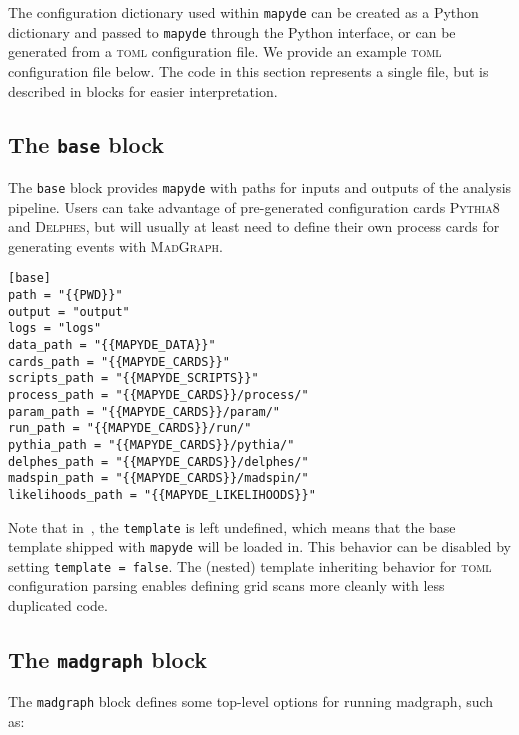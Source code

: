 \documentclass{article}
\newcommand{\mapyde}{\texttt{mapyde}}
\newcommand{\madgraph}{\textsc{MadGraph}}
\newcommand{\pythia}{\textsc{Pythia8}}
\newcommand{\delphes}{\textsc{Delphes}}
\newcommand{\toml}{\textsc{toml}}
\begin{document}
The configuration dictionary used within \mapyde{} can be created as a Python dictionary and passed to \mapyde{} through the Python interface, or can be generated from a \toml{} configuration file.  We provide an example \toml{} configuration file below.  The code in this section represents a single file, but is described in blocks for easier interpretation.

\subsection{The \texttt{base} block}
\label{ssec:the-base-block}

The \texttt{base} block provides \mapyde{} with paths for inputs and outputs of the analysis pipeline.  Users can take advantage of pre-generated configuration cards \pythia{} and \delphes, but will usually at least need to define their own process cards for generating events with \madgraph.

\begin{listing}[H]
	\begin{verbatim}
[base]
path = "{{PWD}}"
output = "output"
logs = "logs"
data_path = "{{MAPYDE_DATA}}"
cards_path = "{{MAPYDE_CARDS}}"
scripts_path = "{{MAPYDE_SCRIPTS}}"
process_path = "{{MAPYDE_CARDS}}/process/"
param_path = "{{MAPYDE_CARDS}}/param/"
run_path = "{{MAPYDE_CARDS}}/run/"
pythia_path = "{{MAPYDE_CARDS}}/pythia/"
delphes_path = "{{MAPYDE_CARDS}}/delphes/"
madspin_path = "{{MAPYDE_CARDS}}/madspin/"
likelihoods_path = "{{MAPYDE_LIKELIHOODS}}"
        \end{verbatim}
	\caption{The \texttt{base} block of an example \toml{} configuration file for generating slepton events.}
	\label{slepton-config-base}
\end{listing}

Note that in~, the \texttt{template} is left undefined, which means that the base template shipped with \mapyde{} will be loaded in. This behavior can be disabled by setting \texttt{template = false}. The (nested) template inheriting behavior for \toml{} configuration parsing enables defining grid scans more cleanly with less duplicated code.

\subsection{The \texttt{madgraph} block}
\label{ssec:the-madgraph-block}

The \texttt{madgraph} block defines some top-level options for running madgraph, such as:
\end{document}
